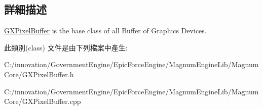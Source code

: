 \subsection{詳細描述}
\hyperlink{class_i_dream_sky_1_1_g_x_pixel_buffer}{G\+X\+Pixel\+Buffer} is the base class of all Buffer of Graphics Devices. 

此類別(class) 文件是由下列檔案中產生\+:\begin{DoxyCompactItemize}
\item 
C\+:/innovation/\+Government\+Engine/\+Epic\+Force\+Engine/\+Magnum\+Engine\+Lib/\+Magnum\+Core/G\+X\+Pixel\+Buffer.\+h\item 
C\+:/innovation/\+Government\+Engine/\+Epic\+Force\+Engine/\+Magnum\+Engine\+Lib/\+Magnum\+Core/G\+X\+Pixel\+Buffer.\+cpp\end{DoxyCompactItemize}
